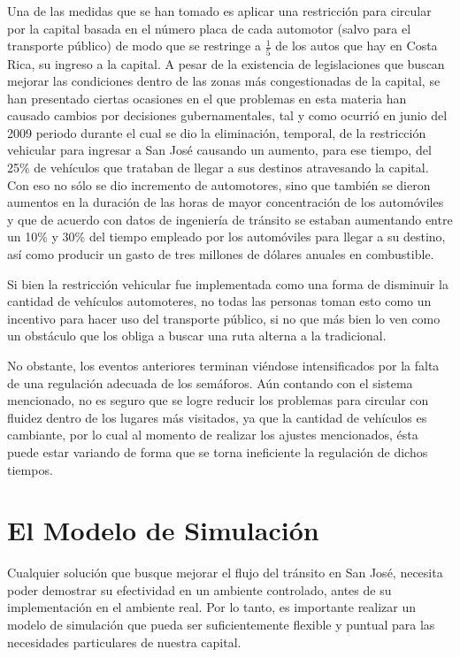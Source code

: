 \documentclass[12pt,journal,compsoc]{IEEEtran}
\begin{document}
		Una de las medidas que se han tomado es aplicar una restricci\'on para circular por la capital basada en el n\'umero placa de cada automotor (salvo para el transporte p\'ublico) de modo que se restringe a  $\frac{1}{5}$ de los autos que hay en Costa Rica, su ingreso a la capital. A pesar de la existencia de legislaciones que buscan mejorar las condiciones dentro de las zonas m\'{a}s congestionadas de la capital, se han presentado ciertas ocasiones en el que problemas en esta materia han causado cambios por decisiones gubernamentales, tal y como ocurri\'{o} en junio del 2009 periodo durante el cual se dio la eliminaci\'{o}n, temporal, de la restricci\'{o}n vehicular para
	ingresar a San Jos\'{e} causando un aumento, para ese tiempo, del 25\% de
	veh\'{i}culos que trataban de llegar a sus destinos atravesando la
	capital. Con eso no s\'{o}lo se dio incremento de automotores, sino que
	tambi\'{e}n se dieron aumentos en la duraci\'{o}n de las horas de mayor
	concentraci\'{o}n de los autom\'{o}viles y que de acuerdo con datos de
	ingenier\'{i}a de tr\'{a}nsito se estaban aumentando entre un 10\% y 30\% 
	del tiempo empleado por los autom\'{o}viles para llegar a su destino, as\'{i} como
	producir un gasto de tres millones de d\'olares anuales en combustible.\cite{Mata2009}
		
		Si bien la restricci\'{o}n vehicular fue implementada como una forma de disminuir la cantidad de veh\'{i}culos automoteres, no todas las personas toman esto como un incentivo para hacer uso del transporte p\'{u}blico, si no que m\'{a}s bien lo ven como un obst\'{a}culo que los obliga a buscar una ruta alterna a la tradicional.
		
		No obstante, los eventos anteriores terminan vi\'{e}ndose intensificados  por la
	falta de una regulaci\'{o}n adecuada de los sem\'{a}foros. A\'un contando con el sistema
	mencionado, no es seguro que se logre reducir los problemas para circular con
	fluidez dentro de los lugares m\'{a}s visitados, ya que la cantidad de veh\'{i}culos es
	cambiante, por lo cual al momento de realizar los ajustes mencionados, \'{e}sta puede estar variando de forma que se torna ineficiente la regulaci\'{o}n de dichos tiempos.

\section{El Modelo de Simulaci\'{o}n}
Cualquier soluci\'on que busque mejorar el flujo del tr\'ansito en San Jos\'e, necesita poder demostrar su efectividad en un ambiente controlado, antes de su implementaci\'on en el ambiente real. Por lo tanto, es importante realizar un modelo de simulaci\'{o}n que pueda ser suficientemente flexible y puntual para las necesidades particulares de nuestra capital.
\end{document}
